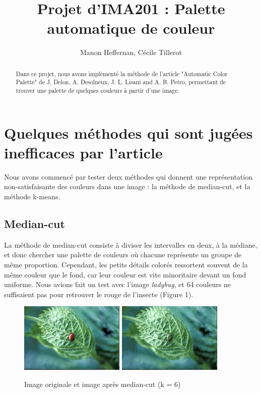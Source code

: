 \documentclass{article}
\title{Projet d'IMA201 : Palette automatique de couleur}
\author{Manon Heffernan, Cécile Tillerot}
\begin{document}
\maketitle

\begin{abstract}
Dans ce projet, nous avons implémenté la méthode de l'article "Automatic Color Palette" de J. Delon, A. Desolneux, J. L. Lisani and A. B. Petro, permettant de trouver une palette de quelques couleurs à partir d'une image.
\end{abstract}

\section{Quelques méthodes qui sont jugées inefficaces par l'article}

Nous avons commencé par tester deux méthodes qui donnent une représentation non-satisfaisante des couleurs dans une image : la méthode de median-cut, et la méthode k-means.\\

\subsection{Median-cut}

La méthode de median-cut consiste à diviser les intervalles en deux, à la médiane, et donc chercher une palette de couleurs où chacune représente un groupe de même proportion. Cependant, les petits détails colorés ressortent souvent de la même couleur que le fond, car leur couleur est vite minoritaire devant un fond uniforme. Nous avions fait un test avec l'image {\it ladybug}, et 64 couleurs ne suffisaient pas pour retrouver le rouge de l'insecte (Figure 1).\\

\begin{figure}[h]
    \centering
     \includegraphics[width=5cm]{ladybug_example.jpeg}
     \includegraphics[width=5cm]{ladybug_2^16.jpg}
     \caption{Image originale et image après median-cut (k = 6)}
\end{figure}
\end{document}
